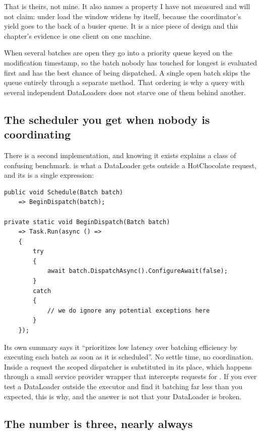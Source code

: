 That is theirs, not mine. It also names a property I have not measured and will
not claim: under load the window widens by itself, because the coordinator's
yield goes to the back of a busier queue. It is a nice piece of design and this
chapter's evidence is one client on one machine.

%
When several batches are open they go into a priority queue keyed on the
modification timestamp, so the batch nobody has touched for longest is evaluated
first and has the best chance of being dispatched. A single open batch skips the
queue entirely through a separate method. That ordering is why a query with
several independent DataLoaders does not starve one of them behind another.

\subsection*{The scheduler you get when nobody is coordinating}

%
There is a second implementation, and knowing it exists explains a class of
confusing benchmark.  is what a DataLoader gets outside
a HotChocolate request, and its  is a single expression:

\begin{verbatim}
public void Schedule(Batch batch)
    => BeginDispatch(batch);

private static void BeginDispatch(Batch batch)
    => Task.Run(async () =>
    {
        try
        {
            await batch.DispatchAsync().ConfigureAwait(false);
        }
        catch
        {
            // we do ignore any potential exceptions here
        }
    });
\end{verbatim}

Its own summary says it \enquote{prioritizes low latency over batching
efficiency by executing each batch as soon as it is scheduled}. No settle time,
no coordination. Inside a request the scoped dispatcher is substituted in its
place, which happens through a small service provider wrapper that intercepts
requests for . If you ever test a DataLoader outside the
executor and find it batching far less than you expected, this is why, and the
answer is not that your DataLoader is broken.

\subsection*{The number is three, nearly always}

